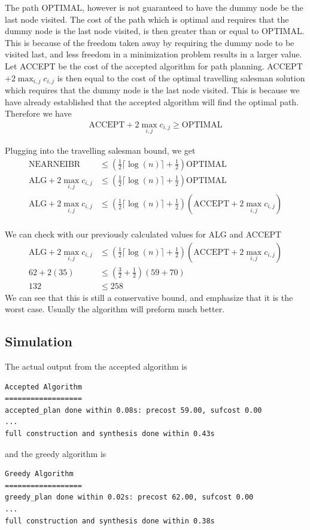 The path OPTIMAL, however is not guaranteed to have the dummy node be the last node visited. The cost of the path which is optimal and requires that the dummy node is the last node visited, is then greater than or equal to OPTIMAL. This is because of the freedom taken away by requiring the dummy node to be visited last, and less freedom in a minimization problem results in a larger value. Let ACCEPT be the cost of the accepted algorithm for path planning. ACCEPT $+ 2\max_{i,j} c_{i,j}$ is then equal to the cost of the optimal travelling salesman solution which requires that the dummy node is the last node visited. This is because we have already established that the accepted algorithm will find the optimal path. Therefore we have
\begin{align*}
\text{ACCEPT} + 2\max_{i,j} c_{i,j} \geq \text{OPTIMAL}
\end{align*}

Plugging into the travelling salesman bound, we get
\begin{align*}
\text{NEARNEIBR} &\leq (\frac{1}{2} \lceil \log(n) \rceil + \frac{1}{2}) \text{OPTIMAL} \\
\text{ALG} + 2\max_{i,j} c_{i,j} &\leq (\frac{1}{2} \lceil \log(n) \rceil + \frac{1}{2}) \text{OPTIMAL} \\
\text{ALG} + 2\max_{i,j} c_{i,j} &\leq (\frac{1}{2} \lceil \log(n) \rceil + \frac{1}{2}) (\text{ACCEPT} + 2 \max_{i,j} c_{i,j}) \\ 
\end{align*} 


We can check with our previously calculated values for ALG and ACCEPT
\begin{align*}
\text{ALG} + 2\max_{i,j} c_{i,j} &\leq (\frac{1}{2} \lceil \log(n) \rceil + \frac{1}{2}) (\text{ACCEPT} + 2 \max_{i,j} c_{i,j}) \\ 
62 + 2 (35) &\leq (\frac{3}{2} + \frac{1}{2})(59+70) \\
132 &\leq 258
\end{align*}
We can see that this is still a conservative bound, and emphasize that it is the worst case. Usually the algorithm will preform much better.

\subsection{Simulation}
The actual output from the accepted algorithm is 
\begingroup
\fontsize{9pt}{12pt}\selectfont
\begin{lstlisting}
Accepted Algorithm
==================
accepted_plan done within 0.08s: precost 59.00, sufcost 0.00
...
full construction and synthesis done within 0.43s 
\end{lstlisting}
\endgroup
and the greedy algorithm is 
\begingroup
\fontsize{9pt}{12pt}\selectfont
\begin{lstlisting}
Greedy Algorithm
==================
greedy_plan done within 0.02s: precost 62.00, sufcost 0.00
...
full construction and synthesis done within 0.38s 
\end{lstlisting}
\endgroup

